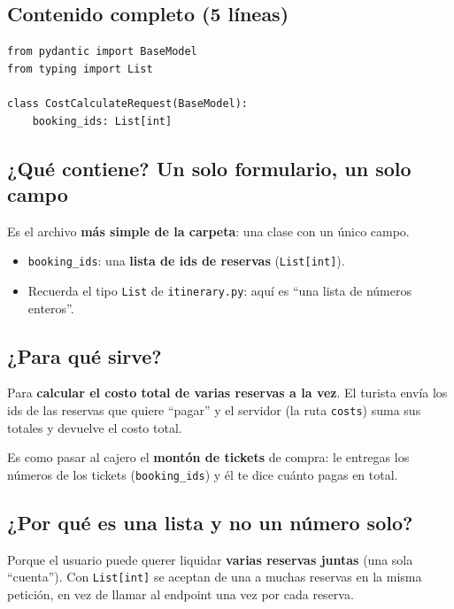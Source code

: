 \documentclass[11pt,a4paper]{article}
\begin{document}
\subsection{Contenido completo (5 líneas)}

\begin{lstlisting}
from pydantic import BaseModel
from typing import List

class CostCalculateRequest(BaseModel):
    booking_ids: List[int]
\end{lstlisting}

\subsection{¿Qué contiene? Un solo formulario, un solo campo}

Es el archivo \textbf{más simple de la carpeta}: una clase con un único campo.

\begin{itemize}
    \item \texttt{booking\_ids}: una \textbf{lista de ids de reservas} (\texttt{List[int]}).
    \item Recuerda el tipo \texttt{List} de \texttt{itinerary.py}: aquí es ``una lista de
    números enteros''.
\end{itemize}

\subsection{¿Para qué sirve?}

Para \textbf{calcular el costo total de varias reservas a la vez}. El turista envía los ids de
las reservas que quiere ``pagar'' y el servidor (la ruta \texttt{costs}) suma sus totales y
devuelve el costo total.

\begin{analogia}
Es como pasar al cajero el \textbf{montón de tickets} de compra: le entregas los números de
los tickets (\texttt{booking\_ids}) y él te dice cuánto pagas en total.
\end{analogia}

\subsection{¿Por qué es una \textbf{lista} y no un número solo?}

Porque el usuario puede querer liquidar \textbf{varias reservas juntas} (una sola ``cuenta'').
Con \texttt{List[int]} se aceptan de una a muchas reservas en la misma petición, en vez de
llamar al endpoint una vez por cada reserva.
\end{document}
